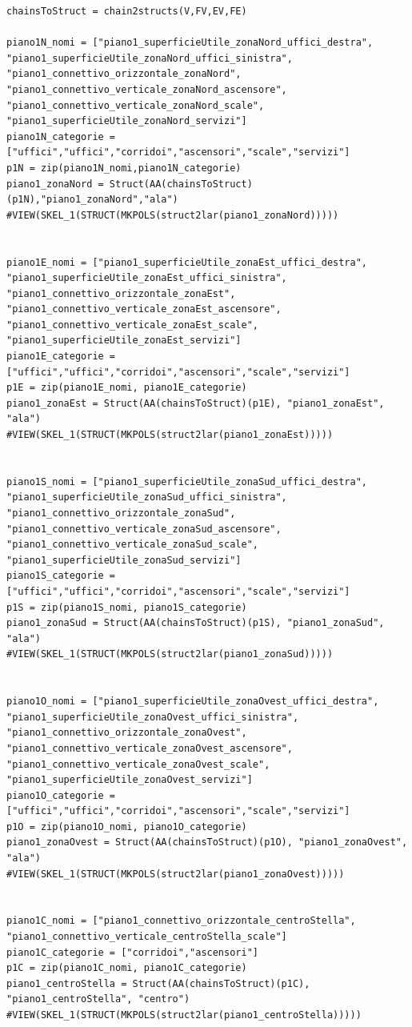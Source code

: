 \documentclass[11pt, oneside]{article}   	%
\begin{document}
\begin{verbatim}
chainsToStruct = chain2structs(V,FV,EV,FE)

piano1N_nomi = ["piano1_superficieUtile_zonaNord_uffici_destra", "piano1_superficieUtile_zonaNord_uffici_sinistra", "piano1_connettivo_orizzontale_zonaNord", "piano1_connettivo_verticale_zonaNord_ascensore", "piano1_connettivo_verticale_zonaNord_scale", "piano1_superficieUtile_zonaNord_servizi"]
piano1N_categorie = ["uffici","uffici","corridoi","ascensori","scale","servizi"]
p1N = zip(piano1N_nomi,piano1N_categorie)
piano1_zonaNord = Struct(AA(chainsToStruct)(p1N),"piano1_zonaNord","ala")
#VIEW(SKEL_1(STRUCT(MKPOLS(struct2lar(piano1_zonaNord)))))


piano1E_nomi = ["piano1_superficieUtile_zonaEst_uffici_destra", "piano1_superficieUtile_zonaEst_uffici_sinistra", "piano1_connettivo_orizzontale_zonaEst", "piano1_connettivo_verticale_zonaEst_ascensore", "piano1_connettivo_verticale_zonaEst_scale", "piano1_superficieUtile_zonaEst_servizi"]
piano1E_categorie = ["uffici","uffici","corridoi","ascensori","scale","servizi"]
p1E = zip(piano1E_nomi, piano1E_categorie)
piano1_zonaEst = Struct(AA(chainsToStruct)(p1E), "piano1_zonaEst", "ala")
#VIEW(SKEL_1(STRUCT(MKPOLS(struct2lar(piano1_zonaEst)))))


piano1S_nomi = ["piano1_superficieUtile_zonaSud_uffici_destra", "piano1_superficieUtile_zonaSud_uffici_sinistra", "piano1_connettivo_orizzontale_zonaSud", "piano1_connettivo_verticale_zonaSud_ascensore", "piano1_connettivo_verticale_zonaSud_scale", "piano1_superficieUtile_zonaSud_servizi"]
piano1S_categorie = ["uffici","uffici","corridoi","ascensori","scale","servizi"]
p1S = zip(piano1S_nomi, piano1S_categorie)
piano1_zonaSud = Struct(AA(chainsToStruct)(p1S), "piano1_zonaSud", "ala")
#VIEW(SKEL_1(STRUCT(MKPOLS(struct2lar(piano1_zonaSud)))))


piano1O_nomi = ["piano1_superficieUtile_zonaOvest_uffici_destra", "piano1_superficieUtile_zonaOvest_uffici_sinistra", "piano1_connettivo_orizzontale_zonaOvest", "piano1_connettivo_verticale_zonaOvest_ascensore", "piano1_connettivo_verticale_zonaOvest_scale", "piano1_superficieUtile_zonaOvest_servizi"]
piano1O_categorie = ["uffici","uffici","corridoi","ascensori","scale","servizi"]
p1O = zip(piano1O_nomi, piano1O_categorie)
piano1_zonaOvest = Struct(AA(chainsToStruct)(p1O), "piano1_zonaOvest", "ala")
#VIEW(SKEL_1(STRUCT(MKPOLS(struct2lar(piano1_zonaOvest)))))


piano1C_nomi = ["piano1_connettivo_orizzontale_centroStella", "piano1_connettivo_verticale_centroStella_scale"]
piano1C_categorie = ["corridoi","ascensori"]
p1C = zip(piano1C_nomi, piano1C_categorie)
piano1_centroStella = Struct(AA(chainsToStruct)(p1C), "piano1_centroStella", "centro")
#VIEW(SKEL_1(STRUCT(MKPOLS(struct2lar(piano1_centroStella)))))



\end{verbatim}
\end{document}
